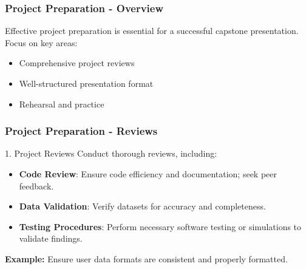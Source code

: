 \documentclass{beamer}
\begin{document}
\begin{frame}[fragile]
    \frametitle{Project Preparation - Overview}
    Effective project preparation is essential for a successful capstone presentation. Focus on key areas:
    \begin{itemize}
        \item Comprehensive project reviews
        \item Well-structured presentation format
        \item Rehearsal and practice
    \end{itemize}
\end{frame}

\begin{frame}[fragile]
    \frametitle{Project Preparation - Reviews}
    \begin{block}{1. Project Reviews}
        Conduct thorough reviews, including:
        \begin{itemize}
            \item \textbf{Code Review}: Ensure code efficiency and documentation; seek peer feedback.
            \item \textbf{Data Validation}: Verify datasets for accuracy and completeness.
            \item \textbf{Testing Procedures}: Perform necessary software testing or simulations to validate findings.
        \end{itemize}
        \textbf{Example:} Ensure user data formats are consistent and properly formatted.
    \end{block}
\end{frame}
\end{document}

